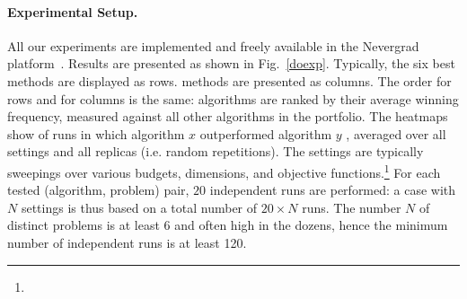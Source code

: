 %
\paragraph{Experimental Setup.} All our experiments are implemented and freely available in the Nevergrad platform~\cite{nevergrad}.  
Results are presented as shown in Fig.~\ref{doexp}. Typically, the six best methods are displayed as rows.  methods are presented as columns. The order for rows and for columns is the same: algorithms are ranked by their average winning frequency, measured against all other algorithms in the portfolio. 
The heatmaps show  of runs in which algorithm $x$  outperformed algorithm $y$ , averaged over all settings and all replicas (i.e. random repetitions).
The settings are typically sweepings over various budgets, dimensions, and objective functions.\footnote{}%
For each tested (algorithm, problem) pair, $20$ independent runs are performed: a case with $N$ settings is thus based on a total number of $20\times N$ runs. The number $N$ of distinct problems is at least $6$ and often high in the dozens, hence the minimum number of independent runs is at least 120.
